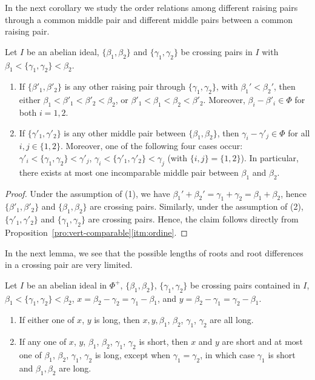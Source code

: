 \documentclass[ALCO,published]{cedram}
\theoremstyle{plain}
\newcommand\be{\beta}
\newcommand\ga{\gamma}
\begin{document}
In the next corollary we study the order relations among different raising pairs through a common middle pair and  different middle pairs between a common raising pair. 

\begin{cor}\label{cor:catene-crossing}
Let $I$ be an abelian ideal, $\{\be_1, \be_2\}$ and $\{\ga_1, \ga_2\}$ be crossing pairs in $I$ with $\be_1< \{\ga_1, \ga_2\}< \be_2$. 
\begin{enumerate}
\item
If $\{\be'_1, \be'_2\}$ is any other raising pair through $\{\ga_1, \ga_2\}$, with $\be_1'<\be_2'$, then either $\be_1< \be'_1< \be'_2< \be_2$, or $\be'_1< \be_1< \be_2< \be'_2$. Moreover,  $\be_i-\be'_i\in \Phi$ for both $i=1, 2$.
\item
If $\{\ga'_1, \ga'_2\}$ is any other middle pair between $\{\be_1, \be_2\}$, then
$\ga_i-\ga'_j\in \Phi$ for all $i,j\in \{1, 2\}$. 
Moreover, one of the following four cases occur: $\ga'_i< \{\ga_1, \ga_2\}< \ga'_j$, $ \ga_i< \{\ga'_1, \ga'_2\}< \ga_j$ (with $\{i, j\}=\{1, 2\}$). 
In particular, there exists at most one incomparable middle pair between 
$\be_1$ and $\be_2$.
\end{enumerate}
\end{cor}

\begin{proof}
Under the assumption of (1), we have $\be_1'+\be_2'=\ga_1+\ga_2=\be_1+\be_2$, hence $\{\be'_1, \be'_2\}$ and $\{\be_1, \be_2\}$ are crossing pairs. 
Similarly, under the assumption of (2),  $\{\ga'_1, \ga'_2\}$ and $\{\ga_1, \ga_2\}$ are crossing pairs. Hence, the claim  follows directly from Proposition~\ref{pro:vert-comparable}\ref{itm:ordine}.  
\end{proof}

In the next lemma, we see that the possible lengths of roots and root differences in a crossing pair are very limited.

\begin{lem}\label{lem:lunghezze-radici-crossing}
Let $I$ be an abelian ideal in $\Phi^+$, $\{\be_1, \be_2\}$,  $\{\ga_1, \ga_2\}$ be crossing pairs contained in $I$, $\be_1 < \{\ga_1,\ga_2\} < \be_2$, 
$x=\be_2-\ga_2=\ga_1-\be_1$, and $y=\be_2-\ga_1=\ga_2-\be_1$.  
\begin{enumerate}
\item\label{itm:xy}
If either one of $x$, $y$ is long, then $x,y, \be_1$, $\be_2$, $\ga_1$, $\ga_2$ are all long. 
\item\label{itm:tutti}
If any one of $x$, $y$, $\be_1$, $\be_2$, $\ga_1$, $\ga_2$ is short,  then $x$ and $y$ are short and at most one of $\be_1$, $\be_2$, $\ga_1$, $\ga_2$ is long, except when $\ga_1=\ga_2$, in which case $\ga_1$ is short and $\be_1, \be_2$ are long. 
\end{enumerate}
\end{lem}
\end{document}

